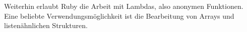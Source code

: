 Weiterhin erlaubt Ruby die Arbeit mit Lambdas, also anonymen Funktionen. Eine beliebte Verwendungsmöglichkeit ist die Bearbeitung von Arrays und listenähnlichen Strukturen.

%                                                                                                                                            
%                                                                                                                                            
%                                                                                                                                            
%                                                                                                                                            

